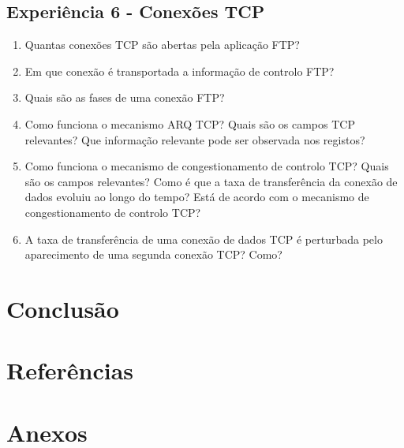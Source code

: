 \documentclass{article}
\begin{document}
\subsection{Experiência 6 - Conexões TCP}
\begin{enumerate}
\item Quantas conexões TCP são abertas pela aplicação FTP?

\item Em que conexão é transportada a informação de controlo FTP?

\item Quais são as fases de uma conexão FTP?

\item Como funciona o mecanismo ARQ TCP? Quais são os campos TCP relevantes? Que informação relevante pode ser observada nos
registos?

\item Como funciona o mecanismo de congestionamento de controlo TCP? Quais são os campos relevantes? Como é que
a taxa de transferência da conexão de dados evoluiu ao longo do tempo? Está de acordo com o mecanismo de congestionamento de controlo TCP?

\item A taxa de transferência de uma conexão de dados TCP é perturbada pelo aparecimento de uma segunda conexão TCP? Como?
\end{enumerate}
\section{Conclusão}
\section{Referências}
\section{Anexos}
\end{document}
